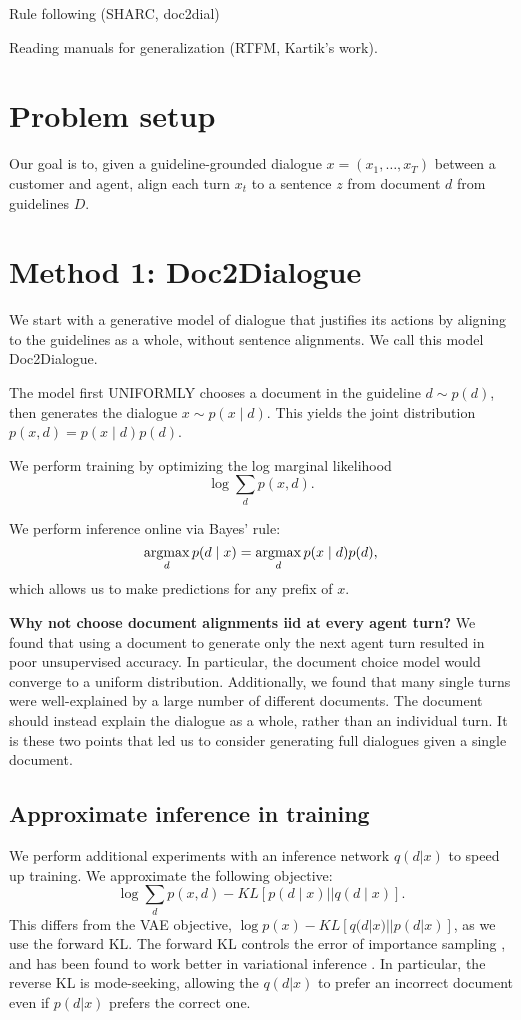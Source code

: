 \documentclass[11pt]{article}
\begin{document}
Rule following (SHARC, doc2dial)

Reading manuals for generalization (RTFM, Kartik's work).

\section{Problem setup}
Our goal is to, given a guideline-grounded dialogue $x = (x_1,\ldots,x_T)$
between a customer and agent,
align each turn $x_t$ to a sentence $z$ from document $d$ from guidelines $D$.


\section{Method 1: Doc2Dialogue}
We start with a generative model of dialogue that justifies its actions by
aligning to the guidelines as a whole, without sentence alignments.
We call this model Doc2Dialogue.

The model first UNIFORMLY chooses a document in the guideline $d \sim p(d)$,
then generates the dialogue $x \sim p(x \mid d)$.
This yields the joint distribution $p(x,d) = p(x\mid d)p(d)$.

We perform training by optimizing the log marginal likelihood
\begin{equation}
\log\sum_d p(x,d).
\end{equation}

We perform inference online via Bayes' rule:
\begin{equation}
\operatorname*{argmax}_d p(d\mid x) = \operatorname*{argmax}_d p(x\mid d)p(d),
\end{equation}
which allows us to make predictions for any prefix of $x$.

\textbf{Why not choose document alignments iid at every agent turn?}
We found that using a document to generate only the next agent turn resulted in poor
unsupervised accuracy.
In particular, the document choice model would converge to a uniform distribution.
Additionally, we found that many single turns were well-explained by a large number of different
documents.
The document should instead explain the dialogue as a whole, rather than an individual turn.
It is these two points that led us to consider generating full dialogues given a single document.

\subsection{Approximate inference in training}
We perform additional experiments with an inference network $q(d|x)$ to speed up training.
We approximate the following objective:
\begin{equation}
\label{eqn:fkl}
\log\sum_d p(x,d) - KL[p(d\mid x) || q(d \mid x)].
\end{equation}
This differs from the VAE objective,
$\log p(x) - KL[q(d|x) || p(d|x)]$,
as we use the forward KL.
The forward KL controls the error of importance sampling \cite{chatterjee},
and has been found to work better in variational inference \cite{fkl}.
In particular, the reverse KL is mode-seeking,
allowing the $q(d|x)$ to prefer an incorrect document
even if $p(d|x)$ prefers the correct one.
\end{document}
